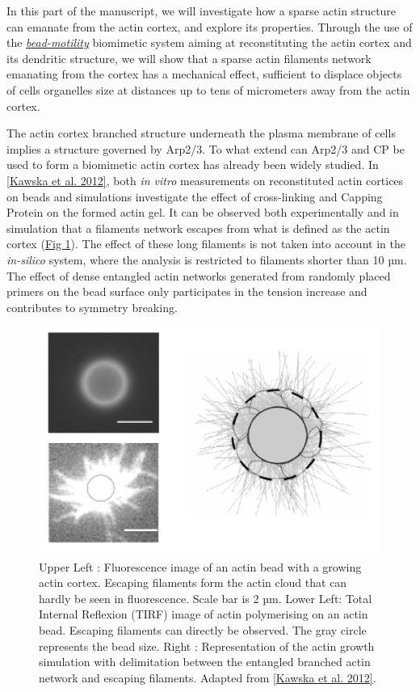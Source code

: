\documentclass[A4paperpaper,11pt,english]{sphinxmanual}
\begin{document}
In this part of the manuscript, we will investigate how a sparse actin structure can
emanate from the actin cortex, and explore its properties. Through the use of the
{\hyperref[index-latex:bead-motility-assay]{\emph{bead-motility}}} biomimetic system aiming at reconstituting
the actin cortex and its dendritic structure, we will show that a sparse actin filaments network
emanating from the cortex has a mechanical effect, sufficient to
displace objects of cells organelles size at distances up to tens of micrometers
away from the actin cortex.

The actin cortex branched structure underneath the plasma membrane of
cells implies a structure governed by Arp2/3. To what extend can Arp2/3 and CP be used
to form a biomimetic actin cortex has already been widely studied. In
{\hyperref[index-latex:kawska2012]{{[}Kawska et al. 2012{]}}}, both \emph{in vitro} measurements on reconstituted actin cortices
on beads and simulations investigate the effect of cross-linking and
Capping Protein on the formed actin gel. It can be observed both experimentally and in
simulation that a filaments network escapes from what is defined as the actin
cortex (\hyperref[index-latex:fig-bead-tirf]{Fig  \ref*{index-latex:fig-bead-tirf}}). The effect of these long filaments is not taken into account in the
\emph{in-silico} system, where the analysis is restricted to filaments shorter than 10
µm. The effect of dense entangled actin networks generated from
randomly placed primers on the bead surface only participates in the tension increase and
contributes to symmetry breaking.
\begin{figure}[htbp]
\centering
\capstart

\includegraphics[width=0.700\linewidth]{Bead-tirf-fluo-sim.png}
\caption{Upper Left : Fluorescence image of an actin bead with a growing actin
cortex. Escaping filaments form the actin cloud that can  hardly  be seen
in fluorescence. Scale bar is 2 µm. Lower Left: Total Internal Reflexion
(TIRF) image of actin polymerising on an actin bead. Escaping filaments can
directly be observed. The gray circle represents the bead size.  Right :
Representation of the actin growth simulation with delimitation between the
entangled branched actin network and escaping filaments.  Adapted from
{\hyperref[index-latex:kawska2012]{{[}Kawska et al. 2012{]}}}.}\label{index-latex:fig-bead-tirf}\end{figure}
\end{document}

